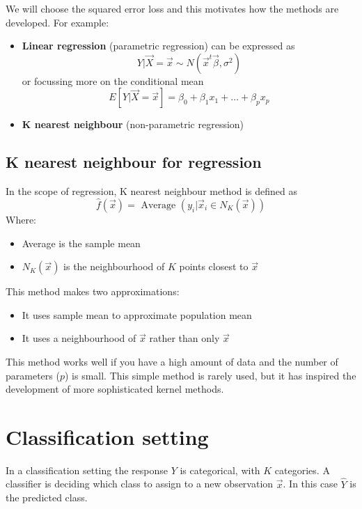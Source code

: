     We will choose the squared error loss and this motivates how the methods are developed.
    For example:
    \begin{itemize}
      \item \textbf{Linear regression} (parametric regression) can be expressed as 
            $$Y|\vec{X} = \vec{x} \sim N(\vec{x}^t\vec{\beta}, \sigma^2)$$ 
            or focussing more on the conditional mean
            $$E[Y|\vec{X} = \vec{x}] = \beta_0 + \beta_1x_1 + \dots + \beta_px_p$$
      \item \textbf{K nearest neighbour} (non-parametric regression)
    \end{itemize}

    \subsection{K nearest neighbour for regression}
      In the scope of regression, K nearest neighbour method is defined as
      $$\hat{f}(\vec{x}) = \text{ Average } (y_i | \vec{x}_i \in N_K(\vec{x}))$$
      Where:
      \begin{itemize}
        \item Average is the sample mean
        \item $N_K(\vec{x})$ is the neighbourhood of $K$ points closest to $\vec{x}$
      \end{itemize}

      This method makes two approximations:
      \begin{itemize}
        \item It uses sample mean to approximate population mean
        \item It uses a neighbourhood of $\vec{x}$ rather than only $\vec{x}$
      \end{itemize}
      
      This method works well if you have a high amount of data and the number of parameters ($p$) is small.
      This simple method is rarely used, but it has inspired the development of more sophisticated kernel methods.

  \section{Classification setting}
    In a classification setting the response $Y$ is categorical, with $K$ categories. 
    A classifier is deciding which class to assign to a new observation $\vec{x}$.
    In this case $\hat{Y}$ is the predicted class.
    
